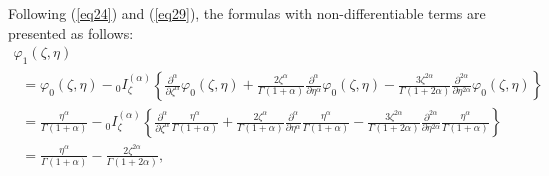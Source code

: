\documentclass[10pt]{NSP1}
\begin{document}
Following (\ref{eq24}) and (\ref{eq29}), the formulas with non-differentiable
terms are presented as follows:\\

\begin{equation}
\label{eq32}
\begin{array}{lll}
 \varphi _1 \left( {\zeta ,\eta } \right) \\
 \;\;=\varphi _0 \left( {\zeta ,\eta } \right)-{ }_0I_\zeta ^{\left( \alpha
\right)}\left\{ {\frac{\partial ^\alpha }{\partial \zeta ^\alpha }\varphi _0
\left( {\zeta ,\eta } \right)+\frac{2\zeta ^\alpha }{\Gamma \left( {1+\alpha
} \right)}\frac{\partial ^\alpha }{\partial \eta ^\alpha }\varphi _0 \left(
{\zeta ,\eta } \right)-\frac{3\zeta ^{2\alpha }}{\Gamma \left( {1+2\alpha }
\right)}\frac{\partial ^{2\alpha }}{\partial \eta ^{2\alpha }}\varphi _0
\left( {\zeta ,\eta } \right)} \right\} \\
\;\; =\frac{\eta ^\alpha }{\Gamma \left( {1+\alpha } \right)}-{ }_0I_\zeta
^{\left( \alpha \right)}\left\{ {\frac{\partial ^\alpha }{\partial \zeta
^\alpha }\frac{\eta ^\alpha }{\Gamma \left( {1+\alpha }
\right)}+\frac{2\zeta ^\alpha }{\Gamma \left( {1+\alpha }
\right)}\frac{\partial ^\alpha }{\partial \eta ^\alpha }\frac{\eta ^\alpha
}{\Gamma \left( {1+\alpha } \right)}-\frac{3\zeta ^{2\alpha }}{\Gamma \left(
{1+2\alpha } \right)}\frac{\partial ^{2\alpha }}{\partial \eta ^{2\alpha
}}\frac{\eta ^\alpha }{\Gamma \left( {1+\alpha } \right)}} \right\} \\
 \;\;=\frac{\eta ^\alpha }{\Gamma \left( {1+\alpha } \right)}-\frac{2\zeta
^{2\alpha }}{\Gamma \left( {1+2\alpha } \right)},
 \end{array}
\end{equation}
\end{document}
